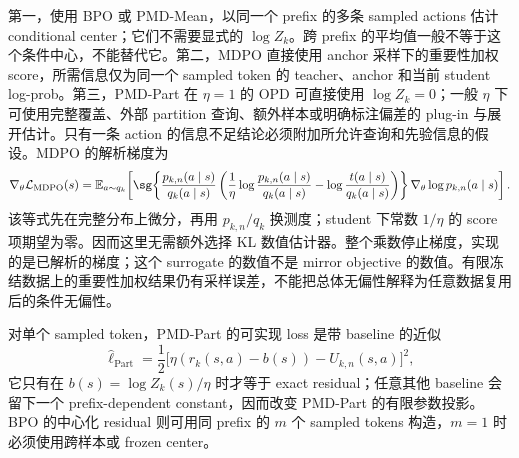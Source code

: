第一，使用 BPO 或 PMD-Mean，以同一个 prefix 的多条 sampled actions 估计 conditional center；它们不需要显式的 $\log Z_k$。跨 prefix 的平均值一般不等于这个条件中心，不能替代它。第二，MDPO 直接使用 anchor 采样下的重要性加权 score，所需信息仅为同一个 sampled token 的 teacher、anchor 和当前 student log-prob。第三，PMD-Part 在 $\eta=1$ 的 OPD 可直接使用 $\log Z_k=0$；一般 $\eta$ 下可使用完整覆盖、外部 partition 查询、额外样本或明确标注偏差的 plug-in 与展开估计。只有一条 action 的信息不足结论必须附加所允许查询和先验信息的假设。MDPO 的解析梯度为
\begin{equation}
\nabla_\theta\mathcal L_{\mathrm{MDPO}}(s)
=\mathbb E_{a\sim q_k}\!\left[
\sg\!\left\{
\frac{p_{k,n}(a\mid s)}{q_k(a\mid s)}
\left(\frac{1}{\eta}\log\frac{p_{k,n}(a\mid s)}{q_k(a\mid s)}
-\log\frac{t(a\mid s)}{q_k(a\mid s)}\right)
\right\}\nabla_\theta\log p_{k,n}(a\mid s)\right].
\end{equation}
该等式先在完整分布上微分，再用 $p_{k,n}/q_k$ 换测度；student 下常数 $1/\eta$ 的 score 项期望为零。因而这里无需额外选择 KL 数值估计器。整个乘数停止梯度，实现的是已解析的梯度；这个 surrogate 的数值不是 mirror objective 的数值。有限冻结数据上的重要性加权结果仍有采样误差，不能把总体无偏性解释为任意数据复用后的条件无偏性。

对单个 sampled token，PMD-Part 的可实现 loss 是带 baseline 的近似
\begin{equation}
\widehat\ell_{\mathrm{Part}}=\frac12\bigl[\eta(r_k(s,a)-b(s))-U_{k,n}(s,a)\bigr]^2,
\end{equation}
它只有在 $b(s)=\log Z_k(s)/\eta$ 时才等于 exact residual；任意其他 baseline 会留下一个 prefix-dependent constant，因而改变 PMD-Part 的有限参数投影。BPO 的中心化 residual 则可用同 prefix 的 $m$ 个 sampled tokens 构造，$m=1$ 时必须使用跨样本或 frozen center。

